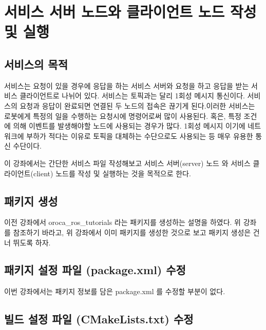 \section{서비스 서버 노드와 클라이언트 노드 작성 및 실행}

\subsection{서비스의 목적}

서비스는 요청이 있을 경우에 응답을 하는 서비스 서버와 요청을 하고 응답을 받는 서비스 클라이언트로 나뉘어 있다. 서비스는 토픽과는 달리 1회성 메시지 통신이다. 서비스의 요청과 응답이 완료되면 연결된 두 노드의 접속은 끊기게 된다.이러한 서비스는 로봇에게 특정의 일을 수행하는 요청시에 명령어로써 많이 사용된다. 혹은, 특정 조건에 의해 이벤트를 발생해야할 노드에 사용되는 경우가 많다. 1회성 메시지 이기에 네트워크에 부하가 적다는 이유로 토픽을 대체하는 수단으로도 사용되는 등 매우 유용한 통신 수단이다.

이 강좌에서는 간단한 서비스 파일 작성해보고 서비스 서버(server) 노드 와 서비스 클라이언트(client) 노드를 작성 및 실행하는 것을 목적으로 한다.

\subsection{패키지 생성}

이전 강좌에서 oroca\_ros\_tutorials 라는 패키지를 생성하는 설명을 하였다. 위 강좌를 참조하기 바라고, 위 강좌에서 이미 패키지를 생성한 것으로 보고 패키지 생성은 건너 뛰도록 하자.

\subsection{패키지 설정 파일 (package.xml) 수정}

이번 강좌에서는 패키지 정보를 담은 package.xml 를 수정할 부분이 없다.

\subsection{빌드 설정 파일 (CMakeLists.txt) 수정}

